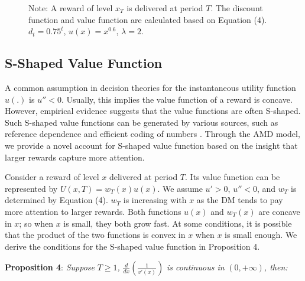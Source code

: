 \documentclass[
  12pt,
]{article}
\begin{document}
\begin{figure}[h]
  \vspace{8pt}
  \begin{minipage}{1.0\textwidth}
{\par\footnotesize Note: A reward of level $x_T$ is delivered at period $T$. The discount function and value function are calculated based on Equation (4). $d_t=0.75^t$, $u(x)=x^{0.6}$, $\lambda=2$.}
\end{minipage}
    
    \label{fig:discount_value_function}
\end{figure}

\hypertarget{s-shaped-value-function}{%
\subsection{\texorpdfstring{S-Shaped Value Function
\label{s_shape_value}}{S-Shaped Value Function }}\label{s-shaped-value-function}}

A common assumption in decision theories for the instantaneous utility
function \(u(.)\) is \(u''<0\). Usually, this implies the value function
of a reward is concave. However, empirical evidence suggests that the
value functions are often S-shaped. Such S-shaped value functions can be
generated by various sources, such as reference dependence
\citep{kahneman1979prospect} and efficient coding of numbers
\citep{louie2012efficient}. Through the AMD model, we provide a novel
account for S-shaped value function based on the insight that larger
rewards capture more attention.

Consider a reward of level \(x\) delivered at period \(T\). Its value
function can be represented by \(U(x,T)=w_T(x)u(x)\). We assume
\(u'>0\), \(u''<0\), and \(w_T\) is determined by Equation (4). \(w_T\)
is increasing with \(x\) as the DM tends to pay more attention to larger
rewards. Both functions \(u(x)\) and \(w_T(x)\) are concave in \(x\); so
when \(x\) is small, they both grow fast. At some conditions, it is
possible that the product of the two functions is convex in \(x\) when
\(x\) is small enough. We derive the conditions for the S-shaped value
function in Proposition 4.

\noindent \textbf{Proposition 4}: \emph{Suppose} \(T\geq1\)\emph{,}
\(\frac{d}{dx}\left(\frac{1}{v'(x)}\right)\) \emph{is continuous in}
\((0,+\infty)\)\emph{, then:}
\end{document}
